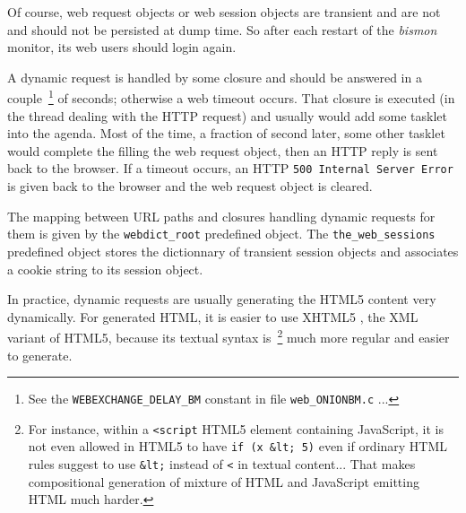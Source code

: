 Of course, web request objects or web session objects are
 transient and are not and should not be persisted at
dump time. So after each restart of the \emph{bismon} monitor, its web
users should login  again.

A dynamic request is handled by some closure  and
should be answered in a couple~\footnote{See the
  \texttt{WEBEXCHANGE\_DELAY\_BM} constant in file
  \texttt{web\_ONIONBM.c} ...} of seconds; otherwise a  web timeout  occurs. That closure is
executed (in the thread dealing with the HTTP request) and usually
would add some  tasklet into the 
agenda. Most of the time, a fraction of second later, some other
tasklet would complete the filling the web request object, then an
HTTP reply is sent back to the browser. If a timeout occurs, an HTTP
\texttt{500 Internal Server Error} is given back to the browser and
the web request object is cleared.

The mapping between URL paths and closures handling dynamic requests
for them is given by the \texttt{webdict\_root} predefined object. The
\texttt{the\_web\_sessions} predefined object stores the dictionnary
of transient session objects and associates a cookie string to its
session object.

In practice, dynamic requests are usually generating the HTML5
 content very dynamically. For generated HTML, it is
easier to use XHTML5 , the XML variant  of
HTML5, because its textual syntax is~\footnote{For instance, within a
  \texttt{<script} HTML5 element containing JavaScript, it is not even
  allowed in HTML5 to have \texttt{if (x \&lt; 5)} even if ordinary
  HTML rules suggest to use \texttt{\&lt;} instead of \texttt{<} in
  textual content... That makes compositional generation of mixture of
  HTML and JavaScript emitting HTML much harder.} much more regular
and easier to generate.
